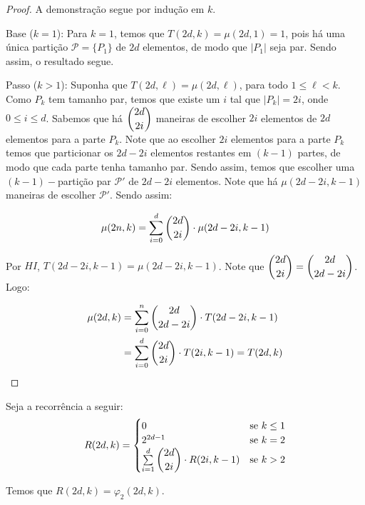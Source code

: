 \documentclass[12pt]{article}
\begin{document}
 \begin{proof}
 	A demonstração segue por indução em $k$. \newl
 	
 	Base ($k = 1$): Para $k = 1$, temos que $T(2d, k) = \mu(2d, 1) = 1$, pois há uma única partição $\mathcal{P}=\{P_1\}$ de $2d$ elementos, de modo que $|P_1|$ seja par. Sendo assim, o resultado segue. \newl
 	
 	Passo ($k > 1$): Suponha que $T(2d, \ell) = \mu(2d, \ell)$, para todo $1 \leq \ell < k$. Como $P_k$ tem tamanho par, temos que existe um $i$ tal que $|P_k| = 2i$, onde $0 \leq i \leq d$. Sabemos que há $\escolhe{2d}{2i}$ maneiras de escolher $2i$ elementos de $2d$ elementos para a parte $P_k$. Note que ao escolher $2i$ elementos para a parte $P_k$ temos que particionar os $2d - 2i$ elementos restantes em $(k-1)$ partes, de modo que cada parte tenha tamanho par. Sendo assim, temos que escolher uma $(k-1)-$partição par $\mathcal{P'}$ de $2d - 2i$ elementos. Note que há $\mu(2d - 2i, k-1)$ maneiras de escolher $\mathcal{P'}$. Sendo assim: 
 	
 	\begin{align}
 		\begin{split}
 			\mu(2n, k) = \sum\limits_{i = 0}^{d}\escolhe{2d}{2i} \cdot \mu(2d - 2i, k-1)
 		\end{split} 
 	\end{align} 
 	
 	Por $HI$, $T(2d - 2i, k-1) = \mu(2d - 2i, k-1)$. Note que $\escolhe{2d}{2i} = \escolhe{2d}{2d - 2i} $. Logo:
 	
 	\begin{align}
 		\begin{split}
 			\mu(2d, k) &= \sum\limits_{i = 0}^{n}\escolhe{2d}{2d - 2i} \cdot T(2d - 2i, k-1)\\
 			&= \sum\limits_{i = 0}^{d}\escolhe{2d}{2i} \cdot T(2i, k-1) = T(2d, k)
 		\end{split} 
 	\end{align}
 	
 \end{proof} \newl
 
 
  \begin{lema}  
 	\label{lema3}
 	Seja a recorrência a seguir: \\
 	
 	\begin{equation}
 		R(2d, k) =
 		\begin{cases}
 			0 & \text{se $k \leq 1$}\\
 			2^{2d - 1} & \text{se $k = 2$} \\
 			\sum\limits_{i = 1}^{d} \escolhe{2d}{2i} \cdot R(2i, k-1) & \text{se $k > 2$} \\ 
 		\end{cases}
 	\end{equation}
 	
 	Temos que $R(2d, k) = \varphi_2(2d, k)$.
 \end{lema}
  
\end{document}
